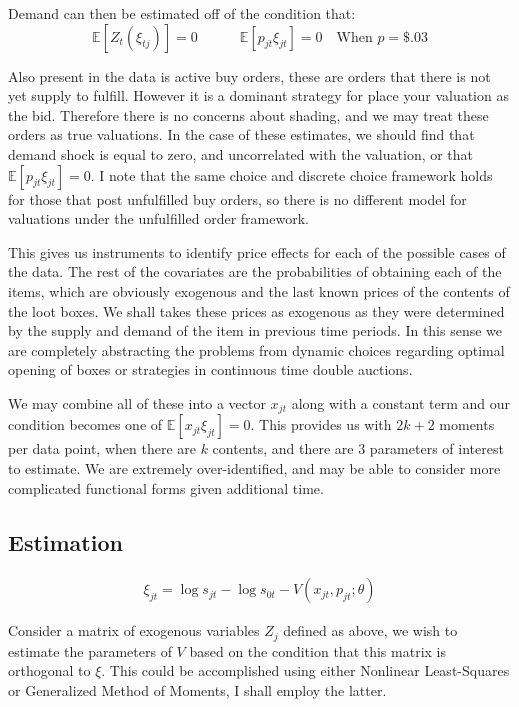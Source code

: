 \documentclass[12pt]{paper}
\newcommand{\exV}[1]{\mathbb{E} \left [ #1 \right ]}
\begin{document}
Demand can then be estimated off of the condition that:
\begin{equation*}
  \exV{Z_t (\xi_{tj})} = 0 \quad \quad \quad \exV{ p_{jt} \xi_{jt} } = 0 \quad \text{When } p = \$.03
\end{equation*}

Also present in the data is active buy orders, these are orders
that there is not yet supply to fulfill. However it is a dominant
strategy for place your valuation as the bid. Therefore there is no
concerns about shading, and we may treat these orders as true
valuations. In the case of these estimates, we should find that demand
shock is equal to zero, and uncorrelated with the valuation, or that
$\exV{p_{jt}\xi_{jt}} = 0$. I note that the same choice and discrete
choice framework holds for those that post unfulfilled buy orders, so
there is no different model for valuations under the unfulfilled order
framework. 

This gives us instruments to identify price effects for each of the
possible cases of the data. The rest of the covariates are the
probabilities of obtaining each of the items, which are obviously
exogenous and the last known prices of the contents of the loot
boxes. We shall takes these prices as exogenous as they were
determined by the supply and demand of the item in previous time
periods. In this sense we are completely abstracting the problems from
dynamic choices regarding optimal opening of boxes or strategies in
continuous time double auctions. 

We may combine all of these into a vector $x_{jt}$ along with a
constant term and our condition becomes one of
$\exV{x_{jt}\xi_{jt}} = 0$. This provides us with $2k + 2$ moments per
data point, when there are $k$ contents, and there are $3$
parameters of interest to estimate. We are extremely over-identified,
and may be able to consider more complicated functional forms given
additional time.


\subsection{Estimation}

\begin{align*}
  \xi_{jt} = \log s_{jt} - \log s_{0t} - V( x_{jt}, p_{jt}; \theta)
\end{align*}


Consider a matrix of exogenous variables $Z_j$ defined as above, we wish
to estimate the parameters of $V$ based on the condition that this
matrix is orthogonal to $\xi$. This could be accomplished using either
Nonlinear Least-Squares or Generalized Method of Moments, I shall
employ the latter.
\end{document}

